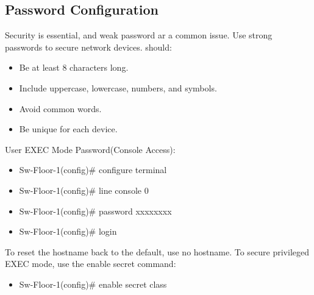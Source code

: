 \documentclass[a4paper,11pt]{article}
\begin{document}
\subsection{Password Configuration}
Security is essential, and weak password ar a common issue. Use strong passwords to secure network devices. should:\\
\begin{itemize}
    \item Be at least 8 characters long.\\
    \item Include uppercase, lowercase, numbers, and symbols.\\
    \item Avoid common words.\\
    \item Be unique for each device.\\
\end{itemize}
\begin{tcolorbox}[colframe=gray!80, colback=gray!20, coltitle=black, title= Example]
     User EXEC Mode Password(Console Access):\\
    \begin{itemize}
        \item Sw-Floor-1(config)\# configure terminal\\
        \item Sw-Floor-1(config)\#  line console 0\\
        \item Sw-Floor-1(config)\# password xxxxxxxx\\
        \item Sw-Floor-1(config)\# login\\
    \end{itemize}
     To reset the hostname back to the default, use no hostname.
     To secure privileged EXEC mode, use the enable secret command:\\
     \begin{itemize}
         \item Sw-Floor-1(config)\# enable secret class\\
     \end{itemize}
\end{tcolorbox}
\end{document}

